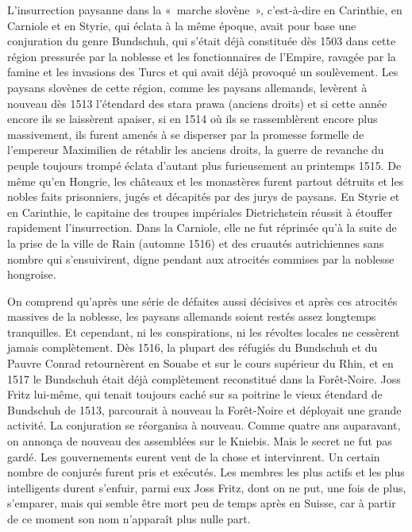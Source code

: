 \documentclass[french,twoside]{book} %
\newcommand\chapterclose{} %
\begin{document}
L’insurrection paysanne dans la « marche slovène », c’est-à-dire en Carinthie, en Carniole et en Styrie, qui éclata à la même époque, avait pour base une conjuration du genre Bundschuh, qui s’était déjà constituée dès 1503 dans cette région pressurée par la noblesse et les fonctionnaires de l’Empire, ravagée par la famine et les invasions des Turcs et qui avait déjà provoqué un soulèvement. Les paysans slovènes de cette région, comme les paysans allemands, levèrent à nouveau dès 1513 l’étendard des stara prawa (anciens droits) et si cette année encore ils se laissèrent apaiser, si en 1514 où ils se rassemblèrent encore plus massivement, ils furent amenés à se disperser par la promesse formelle de l’empereur Maximilien de rétablir les anciens droits, la guerre de revanche du peuple toujours trompé éclata d’autant plus furieusement au printemps 1515. De même qu’en Hongrie, les châteaux et les monastères furent partout détruits et les nobles faits prisonniers, jugés et décapités par des jurys de paysans. En Styrie et en Carinthie, le capitaine des troupes impériales Dietrichstein réussit à étouffer rapidement l’insurrection. Dans la Carniole, elle ne fut réprimée qu’à la suite de la prise de la ville de Rain (automne 1516) et des cruautés autrichiennes sans nombre qui s’ensuivirent, digne pendant aux atrocités commises par la noblesse hongroise.\par
On comprend qu’après une série de défaites aussi décisives et après ces atrocités massives de la noblesse, les paysans allemands soient restés assez longtemps tranquilles. Et cependant, ni les conspirations, ni les révoltes locales ne cessèrent jamais complètement. Dès 1516, la plupart des réfugiés du Bundschuh et du Pauvre Conrad retournèrent en Souabe et sur le cours supérieur du Rhin, et en 1517 le Bundschuh était déjà complètement reconstitué dans la Forêt-Noire. Joss Fritz lui-même, qui tenait toujours caché sur sa poitrine le vieux étendard de Bundschuh de 1513, parcourait à nouveau la Forêt-Noire et déployait une grande activité. La conjuration se réorganisa à nouveau. Comme quatre ans auparavant, on annonça de nouveau des assemblées sur le Kniebis. Mais le secret ne fut pas gardé. Les gouvernements eurent vent de la chose et intervinrent. Un certain nombre de conjurés furent pris et exécutés. Les membres les plus actifs et les plus intelligents durent s’enfuir, parmi eux Joss Fritz, dont on ne put, une fois de plus, s’emparer, mais qui semble être mort peu de temps après en Suisse, car à partir de ce moment son nom n’apparaît plus nulle part.
\chapterclose
\end{document}
